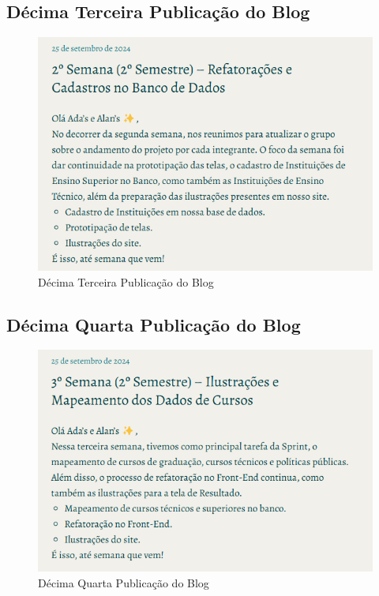 \begin{apendicesenv}
\subsection*{Décima Terceira Publicação do Blog}
\begin{figure}[H]
    \centering
    \includegraphics[width=1.0\linewidth]{images/post13.png}
    \caption{Décima Terceira Publicação do Blog}
    \label{fig:decima primeira}
\end{figure}

\subsection*{Décima Quarta Publicação do Blog}
\begin{figure}[H]
    \centering
    \includegraphics[width=1.0\linewidth]{images/post14.png}
    \caption{Décima Quarta Publicação do Blog}
    \label{fig:decima primeira}
\end{figure}


\end{apendicesenv}
